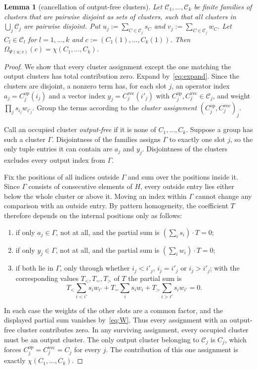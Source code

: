 \documentclass[11pt]{amsart}
\newtheorem{lemma}[theorem]{Lemma}
\theoremstyle{definition}
\theoremstyle{remark}
\numberwithin{equation}{section}
\newcommand{\cC}{\mathcal{C}}
\newcommand{\Cop}{C^{\mathrm{op}}}
\newcommand{\Cvec}{C^{\mathrm{vec}}}
\begin{document}
\begin{lemma}[cancellation of output-free clusters]\label{lem:C}
Let $\cC_1,\dots,\cC_k$ be finite families of clusters that are pairwise disjoint as sets of clusters, such that all
clusters in $\bigcup_j\cC_j$ are pairwise disjoint. Put $u_j:=\sum_{C\in\cC_j}s_C$ and $v_j:=\sum_{C\in\cC_j}w_C$. Let
$C_l\in\cC_l$ for $l=1,\dots,k$ and $c:=(C_1(1),\dots,C_k(1))$. Then $\Omega_{\Psi(u;v)}(c)=\chi(C_1,\dots,C_k)$.
\end{lemma}

\begin{proof}
We show that every cluster assignment except the one matching the output clusters has total contribution zero.
Expand by~\eqref{eq:expand}. Since the clusters are disjoint, a nonzero term has, for each slot $j$, an operator index
$a_j=\Cop_j(i_j)$ and a vector index $y_j=\Cvec_j(i'_j)$ with $\Cop_j,\Cvec_j\in\cC_j$, and weight
$\prod_js_{i_j}w_{i'_j}$. Group the terms according to the \emph{cluster assignment} $(\Cop_j,\Cvec_j)_{j}$.

Call an occupied cluster \emph{output-free} if it is none of $C_1,\dots,C_k$. Suppose a group has such a cluster
$\Gamma$. Disjointness of the families assigns $\Gamma$ to exactly one slot $j$, so the only tuple entries it can
contain are $a_j$ and $y_j$. Disjointness of the clusters excludes every output index from $\Gamma$.

Fix the positions of all indices outside $\Gamma$ and sum over the positions inside it. Since $\Gamma$ consists of
consecutive elements of $H$, every outside entry lies either below the whole cluster or above it. Moving an index
within $\Gamma$ cannot change any comparison with an outside entry. By pattern homogeneity, the coefficient $T$
therefore depends on the internal positions only as follows:
\begin{enumerate}
\item[(i)] if only $a_j\in\Gamma$, not at all, and the partial sum is $(\sum_is_i)\cdot T=0$;
\item[(ii)] if only $y_j\in\Gamma$, not at all, and the partial sum is $(\sum_iw_i)\cdot T=0$;
\item[(iii)] if both lie in $\Gamma$, only through whether $i_j<i'_j$, $i_j=i'_j$ or $i_j>i'_j$; with the corresponding
values $T_<,T_=,T_>$ of $T$ the partial sum is
\[
T_<\sum_{i<i'}s_iw_{i'}+T_=\sum_is_iw_i+T_>\sum_{i>i'}s_iw_{i'}=0 .
\]
\end{enumerate}
In each case the weights of the other slots are a common factor, and the displayed partial sum vanishes
by~\eqref{eq:W}. Thus every assignment with an output-free cluster contributes zero. In any surviving assignment,
every occupied cluster must be an output cluster. The only output cluster belonging to $\cC_j$ is $C_j$, which forces
$\Cop_j=\Cvec_j=C_j$ for every $j$. The contribution of this one assignment is exactly
$\chi(C_1,\dots,C_k)$.
\end{proof}
\end{document}
